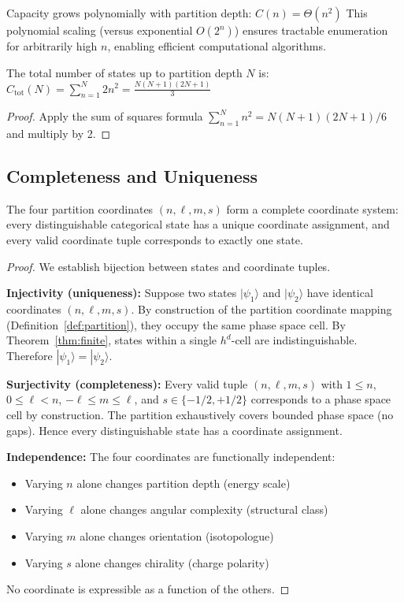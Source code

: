 \begin{corollary}
\label{cor:polynomial}
Capacity grows polynomially with partition depth:
$
C(n) = \Theta(n^2)
$
This polynomial scaling (versus exponential $O(2^n)$) ensures tractable enumeration for arbitrarily high $n$, enabling efficient computational algorithms.
\end{corollary}

\begin{corollary}
\label{cor:cumulative}
The total number of states up to partition depth $N$ is:
$
C_{\mathrm{tot}}(N) = \sum_{n=1}^{N} 2n^2 = \frac{N(N+1)(2N+1)}{3}
$
\end{corollary}

\begin{proof}
Apply the sum of squares formula $\sum_{n=1}^{N} n^2 = N(N+1)(2N+1)/6$ and multiply by 2.
\end{proof}

\subsection{Completeness and Uniqueness}

\begin{theorem}
\label{thm:completeness}
The four partition coordinates $(n, \ell, m, s)$ form a complete coordinate system: every distinguishable categorical state has a unique coordinate assignment, and every valid coordinate tuple corresponds to exactly one state.
\end{theorem}

\begin{proof}
We establish bijection between states and coordinate tuples.

\textbf{Injectivity (uniqueness):} Suppose two states $|\psi_1\rangle$ and $|\psi_2\rangle$ have identical coordinates $(n, \ell, m, s)$. By construction of the partition coordinate mapping (Definition~\ref{def:partition}), they occupy the same phase space cell. By Theorem~\ref{thm:finite}, states within a single $h^d$-cell are indistinguishable. Therefore $|\psi_1\rangle = |\psi_2\rangle$.

\textbf{Surjectivity (completeness):} Every valid tuple $(n, \ell, m, s)$ with $1 \leq n$, $0 \leq \ell < n$, $-\ell \leq m \leq \ell$, and $s \in \{-1/2, +1/2\}$ corresponds to a phase space cell by construction. The partition exhaustively covers bounded phase space (no gaps). Hence every distinguishable state has a coordinate assignment.

\textbf{Independence:} The four coordinates are functionally independent:
\begin{itemize}
    \item Varying $n$ alone changes partition depth (energy scale)
    \item Varying $\ell$ alone changes angular complexity (structural class)
    \item Varying $m$ alone changes orientation (isotopologue)
    \item Varying $s$ alone changes chirality (charge polarity)
\end{itemize}
No coordinate is expressible as a function of the others.
\end{proof}

